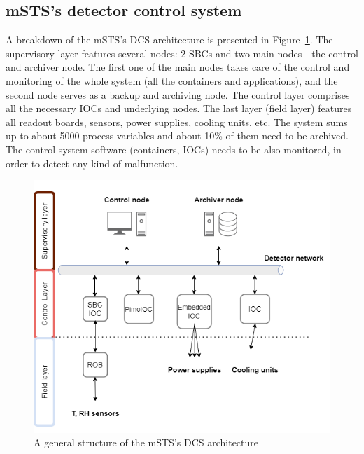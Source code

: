 \subsection{mSTS's detector control system}
A breakdown of the \gls{mSTS}'s \gls{DCS} architecture is presented in Figure~\ref{fig_mstsarch}. The supervisory layer features several nodes: 2 \glspl{SBC} and two main nodes - the control and archiver node. The first one of the main nodes takes care of the control and monitoring of the whole system (all the containers and applications), and the second node serves as a backup and archiving node. The control layer comprises all the necessary \glspl{IOC} and underlying nodes. The last layer (field layer) features all readout boards, sensors, power supplies, cooling units, etc. The system sums up to about 5000 process variables and about 10\% of them need to be archived. The control system software (containers, \glspl{IOC}) needs to be also monitored, in order to detect any kind of malfunction. 

\begin{figure}[!h]
\centering
\includegraphics[width=0.65\columnwidth]{Chapter6/DCS/images/mcbmpng (2).png}
\caption{A general structure of the \gls{mSTS}'s \gls{DCS} architecture}
\label{fig_mstsarch}
\end{figure}

